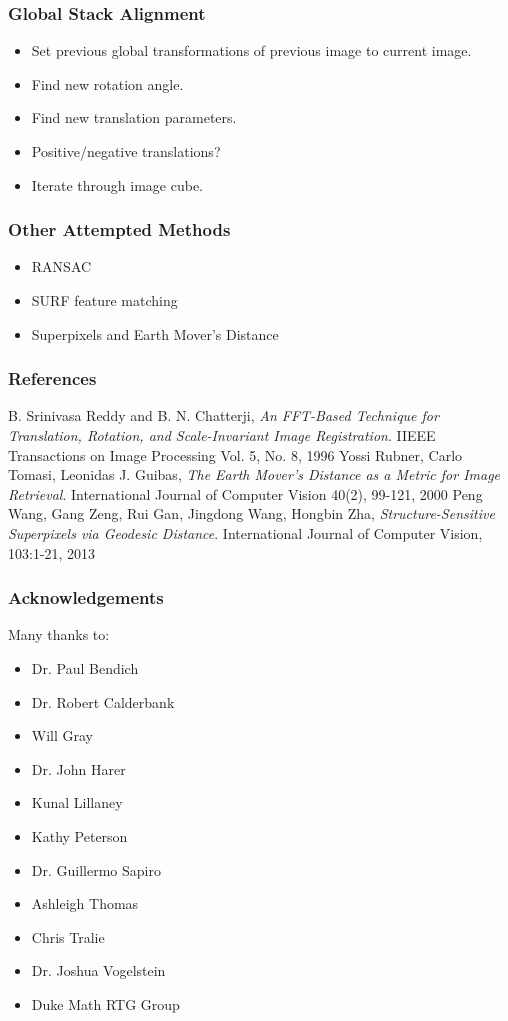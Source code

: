 \documentclass{beamer}
\begin{document}
\begin{frame}
\frametitle{Global Stack Alignment}
\begin{itemize}
\item Set previous global transformations of previous image to current image. 
\item Find new rotation angle.
\item Find new translation parameters.
\item Positive/negative translations? 
\item Iterate through image cube. 
\end{itemize}
\end{frame}

\begin{frame}
\frametitle{Other Attempted Methods}
\begin{itemize}
\item RANSAC
\item SURF feature matching
\item Superpixels and Earth Mover's Distance 
\end{itemize}
\end{frame}

\begin{frame}
\frametitle{References}
\begin{thebibliography}{9}
	B. Srinivasa Reddy and B. N. Chatterji,
	\emph{An FFT-Based Technique for Translation, Rotation, and Scale-Invariant Image Registration}.
	IIEEE Transactions on Image Processing Vol. 5, No. 8, 1996
	Yossi Rubner, Carlo Tomasi, Leonidas J. Guibas,
	\emph{The Earth Mover's Distance as a Metric for Image Retrieval}.
	International Journal of Computer Vision 40(2), 99-121, 2000
	Peng Wang, Gang Zeng, Rui Gan, Jingdong Wang, Hongbin Zha,
	\emph{Structure-Sensitive Superpixels via Geodesic Distance}.
	International Journal of Computer Vision, 103:1-21, 2013
\end{thebibliography} 
\end{frame}

\begin{frame}
\frametitle{Acknowledgements}
Many thanks to:
\begin{itemize}
\item Dr. Paul Bendich 
\item Dr. Robert Calderbank
\item Will Gray 
\item Dr. John Harer
\item Kunal Lillaney
\item Kathy Peterson 
\item Dr. Guillermo Sapiro
\item Ashleigh Thomas 
\item Chris Tralie
\item Dr. Joshua Vogelstein
\item Duke Math RTG Group 
\end{itemize}
\end{frame}
\end{document}
